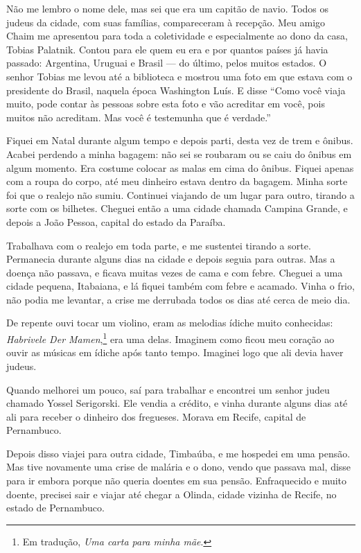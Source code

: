 Não me lembro o nome dele, mas sei que era um capitão de navio. Todos os judeus da cidade, com suas famílias, compareceram à recepção. Meu amigo Chaim me apresentou para toda a coletividade e especialmente ao dono da casa, Tobias Palatnik. Contou para ele quem eu era e por quantos países já havia passado: Argentina, Uruguai e Brasil --- do último, pelos muitos estados. O senhor Tobias me levou até a biblioteca e mostrou uma foto em que estava com o presidente do Brasil, naquela época Washington Luís. E disse ``Como você viaja muito, pode contar às pessoas sobre esta foto e vão acreditar em você, pois muitos não acreditam. Mas você é testemunha que é verdade.''

Fiquei em Natal durante algum tempo e depois parti, desta vez de
trem e ônibus. Acabei perdendo a minha bagagem: não sei se roubaram ou
se caiu do ônibus em algum momento. Era costume colocar as malas
em cima do ônibus. Fiquei apenas com a roupa do corpo, até meu 
dinheiro estava dentro da bagagem. Minha sorte foi
que o realejo não sumiu. Continuei viajando de um lugar para outro,
tirando a sorte com os bilhetes. Cheguei então a uma cidade chamada
Campina Grande, e depois a João Pessoa, capital do estado da Paraíba.

Trabalhava com o realejo em toda parte, e me sustentei tirando a sorte. Permanecia 
durante alguns dias na cidade e depois seguia para outras. Mas a doença não passava, e ficava muitas vezes de cama e com febre. Cheguei a uma cidade pequena, Itabaiana, e lá fiquei também com febre e
acamado. Vinha o frio, não podia me levantar, a crise me derrubada todos os dias até cerca de meio dia. 

De repente ouvi tocar um violino, eram
as melodias ídiche muito conhecidas: \textit{Habrivele Der Mamen},\footnote{Em tradução, \textit{Uma carta para minha mãe}.} era uma delas. Imaginem como ficou meu coração ao ouvir as músicas em ídiche após tanto tempo. Imaginei logo que ali devia haver judeus.

Quando melhorei um pouco, saí para trabalhar e encontrei um senhor judeu
chamado Yossel Serigorski. Ele vendia a crédito, e vinha durante alguns
dias até ali para receber o dinheiro dos fregueses. Morava em Recife, capital de Pernambuco.

Depois disso viajei para outra cidade, Timbaúba, e me hospedei em
uma pensão. Mas tive novamente uma crise de malária e o dono, vendo que passava mal, disse para ir embora porque não queria doentes
em sua pensão. Enfraquecido e muito doente, precisei sair e viajar até
chegar a Olinda, cidade vizinha de Recife, no estado de Pernambuco.

